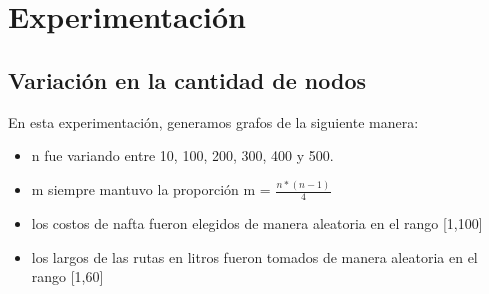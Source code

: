 \section{Experimentación}

\subsection{Variación en la cantidad de nodos}
En esta experimentación, generamos grafos de la siguiente manera: \\
\begin{itemize}
\item n fue variando entre 10, 100, 200, 300, 400 y 500.
\item m siempre mantuvo la proporción m = $\frac{n*(n-1)}{4}$
\item los costos de nafta fueron elegidos de manera aleatoria en el rango [1,100]
\item los largos de las rutas en litros fueron tomados de manera aleatoria en el rango [1,60]
\end{itemize}

